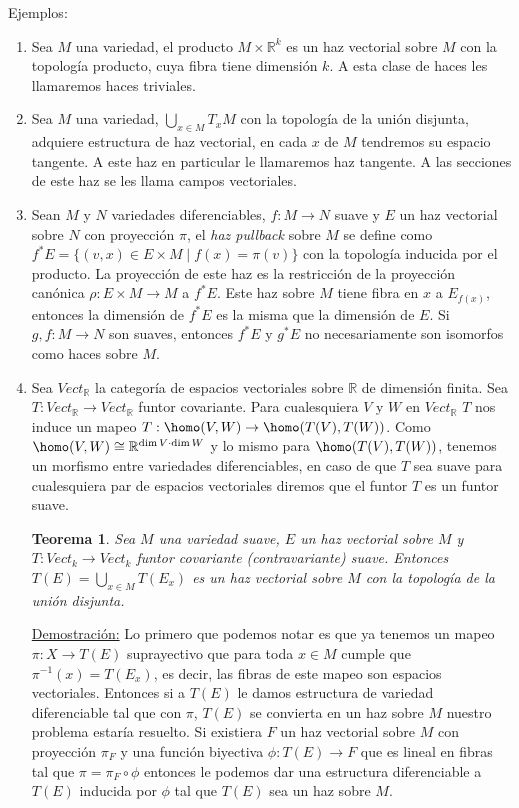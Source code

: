 \documentclass{report}
\newtheorem{theorem}{Teorema}[section]
\theoremstyle{definition}
\let\hom\homo
\DeclareMathOperator{\hom}{Hom}
\begin{document}
Ejemplos:
\begin{enumerate}

\item Sea $M$ una variedad, el producto $M \times \mathbb{R}^k$ es un haz vectorial sobre $M$ con la topolog\'ia producto, cuya fibra tiene dimensi\'on $k$. A esta clase de haces les llamaremos haces triviales.

\item Sea $M$ una variedad, $\bigcup\limits_{x \in M} T_x M$ con la topolog\'ia de la uni\'on disjunta, adquiere estructura de haz vectorial, en cada $x$ de $M$ tendremos su espacio tangente. A este haz en particular le llamaremos haz tangente. A las secciones de este haz se les llama campos vectoriales.

\item Sean $M$ y $N$ variedades diferenciables, $f:M \to N$ suave y $E$ un haz vectorial sobre $N$ con proyecci\'on $\pi$, el \textit{haz pullback} sobre $M$ se define como $f^\ast E = \{ (v, x) \in E \times M \mid f(x) = \pi(v) \}$ con la topolog\'ia inducida por el producto. La proyecci\'on de este haz es la restricci\'on de la proyecci\'on can\'onica $\rho: E \times M \to M$ a $f^\ast E$. Este haz sobre $M$ tiene fibra en $x$ a $E_{f(x)}$, entonces la dimensi\'on de $f^\ast E$ es la misma que la dimensi\'on de $E$. Si $g,f:M \to N$ son suaves, entonces $f^\ast E$ y $g^\ast E$ no necesariamente son isomorfos como haces sobre $M$.

\item Sea $Vect_\mathbb{R}$ la categor\'ia de espacios vectoriales sobre $\mathbb{R}$ de dimensi\'on finita. Sea $T: Vect_\mathbb{R} \to Vect_\mathbb{R}$ funtor covariante. Para cualesquiera $V$ y $W$ en $Vect_\mathbb{R}$ $T$ nos induce un mapeo  $T: \hom (V,W) \to \hom ( T(V) , T(W))$. Como $\hom (V, W) \cong \mathbb{R}^{\dim V \cdot \dim W}$ y lo mismo para $\hom ( T(V) , T(W))$, tenemos un morfismo entre variedades diferenciables, en caso de que $T$ sea suave para cualesquiera par de espacios vectoriales diremos que el funtor $T$ es un funtor suave.

\begin{theorem}
Sea $M$ una variedad suave, $E$ un haz vectorial sobre $M$ y $T: Vect_k \to Vect_k$ funtor covariante (contravariante) suave. Entonces $T(E) = \bigcup\limits_{x \in M} T (E_x)$ es un haz vectorial sobre $M$ con la topolog\'ia de la uni\'on disjunta.


\end{theorem}
\underline{Demostraci\'on:}
 Lo primero que podemos notar es que ya tenemos un mapeo $\pi: X \to T(E)$ suprayectivo que para toda $x \in M$ cumple que $\pi^{-1} (x) = T (E_x)$, es decir, las fibras de este mapeo son espacios vectoriales. Entonces si a $T(E)$ le damos estructura de variedad diferenciable tal que con $\pi$, $T(E)$ se convierta en un haz sobre $M$ nuestro problema estar\'ia resuelto. Si existiera $F$ un haz vectorial sobre $M$ con proyecci\'on $\pi_F$ y una funci\'on biyectiva $\phi: T(E) \to F$ que es lineal en fibras tal que $\pi = \pi_F \circ \phi$ entonces le podemos dar una estructura diferenciable a $T(E)$ inducida por $\phi$ tal que $T(E)$ sea un haz sobre $M$.
\begin{enumerate}[a.]



\end{enumerate}
\end{enumerate}
\end{document}
